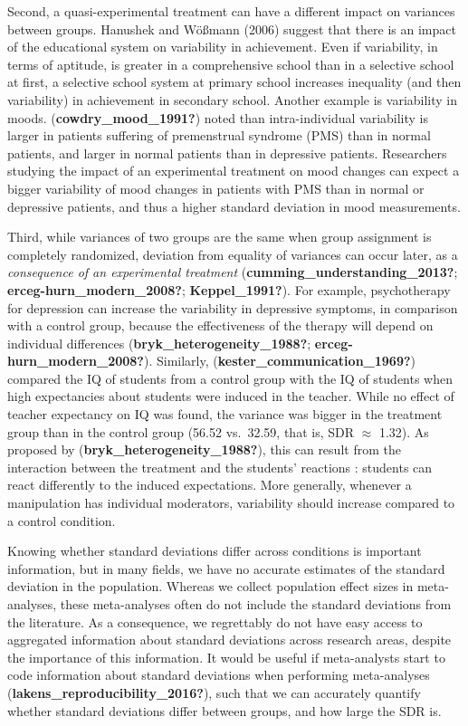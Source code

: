 \documentclass[
  english,
  man]{apa6}
\begin{document}
Second, a quasi-experimental treatment can have a different impact on variances between groups. Hanushek and Wößmann (2006) suggest that there is an impact of the educational system on variability in achievement. Even if variability, in terms of aptitude, is greater in a comprehensive school than in a selective school at first, a selective school system at primary school increases inequality (and then variability) in achievement in secondary school. Another example is variability in moods. (\textbf{cowdry\_mood\_1991?}) noted than intra-individual variability is larger in patients suffering of premenstrual syndrome (PMS) than in normal patients, and larger in normal patients than in depressive patients. Researchers studying the impact of an experimental treatment on mood changes can expect a bigger variability of mood changes in patients with PMS than in normal or depressive patients, and thus a higher standard deviation in mood measurements.

Third, while variances of two groups are the same when group assignment is completely randomized, deviation from equality of variances can occur later, as a \emph{consequence of an experimental treatment} (\textbf{cumming\_understanding\_2013?}; \textbf{erceg-hurn\_modern\_2008?}; \textbf{Keppel\_1991?}). For example, psychotherapy for depression can increase the variability in depressive symptoms, in comparison with a control group, because the effectiveness of the therapy will depend on individual differences (\textbf{bryk\_heterogeneity\_1988?}; \textbf{erceg-hurn\_modern\_2008?}). Similarly, (\textbf{kester\_communication\_1969?}) compared the IQ of students from a control group with the IQ of students when high expectancies about students were induced in the teacher. While no effect of teacher expectancy on IQ was found, the variance was bigger in the treatment group than in the control group (56.52 vs.~32.59, that is, SDR \(\approx\) 1.32). As proposed by (\textbf{bryk\_heterogeneity\_1988?}), this can result from the interaction between the treatment and the students' reactions : students can react differently to the induced expectations. More generally, whenever a manipulation has individual moderators, variability should increase compared to a control condition.

Knowing whether standard deviations differ across conditions is important information, but in many fields, we have no accurate estimates of the standard deviation in the population. Whereas we collect population effect sizes in meta-analyses, these meta-analyses often do not include the standard deviations from the literature. As a consequence, we regrettably do not have easy access to aggregated information about standard deviations across research areas, despite the importance of this information. It would be useful if meta-analysts start to code information about standard deviations when performing meta-analyses (\textbf{lakens\_reproducibility\_2016?}), such that we can accurately quantify whether standard deviations differ between groups, and how large the SDR is.
\end{document}
